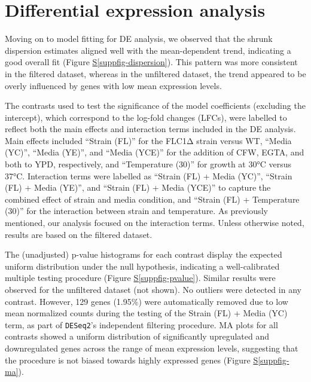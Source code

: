 \documentclass[
  a4paper,
]{scrreprt}
\newcommand*\quartosuppfigref[1]{Figure \hyperref[#1]{S\ref{#1}}}
\begin{document}
\section{Differential expression
analysis}\label{differential-expression-analysis}

Moving on to model fitting for DE analysis, we observed that the shrunk
dispersion estimates aligned well with the mean-dependent trend,
indicating a good overall fit (\quartosuppfigref{suppfig-dispersion}).
This pattern was more consistent in the filtered dataset, whereas in the
unfiltered dataset, the trend appeared to be overly influenced by genes
with low mean expression levels.

The contrasts used to test the significance of the model coefficients
(excluding the intercept), which correspond to the log-fold changes
(LFCs), were labelled to reflect both the main effects and interaction
terms included in the DE analysis. Main effects included ``Strain (FL)''
for the FLC1Δ strain versus WT, ``Media (YC)'', ``Media (YE)'', and
``Media (YCE)'' for the addition of CFW, EGTA, and both to YPD,
respectively, and ``Temperature (30)'' for growth at 30°C versus 37°C.
Interaction terms were labelled as ``Strain (FL) + Media (YC)'',
``Strain (FL) + Media (YE)'', and ``Strain (FL) + Media (YCE)'' to
capture the combined effect of strain and media condition, and ``Strain
(FL) + Temperature (30)'' for the interaction between strain and
temperature. As previously mentioned, our analysis focused on the
interaction terms. Unless otherwise noted, results are based on the
filtered dataset.

The (unadjusted) p-value histograms for each contrast display the
expected uniform distribution under the null hypothesis, indicating a
well-calibrated multiple testing procedure
(\quartosuppfigref{suppfig-pvalue}). Similar results were observed for
the unfiltered dataset (not shown). No outliers were detected in any
contrast. However, 129 genes (1.95\%) were automatically removed due to
low mean normalized counts during the testing of the Strain (FL) + Media
(YC) term, as part of \texttt{DESeq2}'s independent filtering procedure.
MA plots for all contrasts showed a uniform distribution of
significantly upregulated and downregulated genes across the range of
mean expression levels, suggesting that the procedure is not biased
towards highly expressed genes (\quartosuppfigref{suppfig-ma}).
\end{document}
